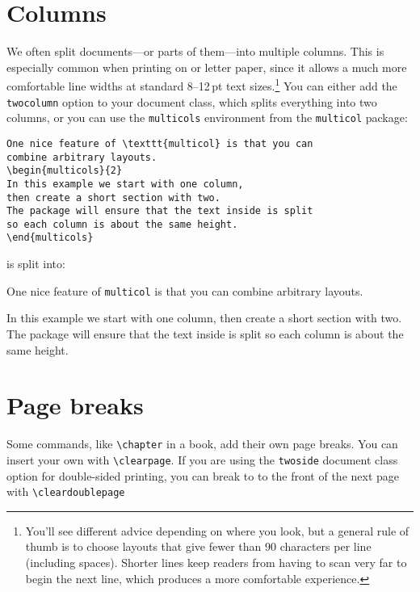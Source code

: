 \section{Columns}

We often split documents---or parts of them---into multiple columns.
This is especially common when printing on  or  letter
paper, since it allows a much more comfortable line widths at standard
8--12\,pt text sizes.\punckern\footnote{You'll see different advice depending
on where you look, but a general rule of thumb is to choose layouts that give
fewer than 90 characters per line (including spaces).
Shorter lines keep readers from having to scan very far to begin the next line,
which produces a more comfortable experience.}
You can either add the \texttt{twocolumn} option to your document class,
which splits everything into two columns, or you can use the \texttt{multicols}
environment from the \texttt{multicol} package:
\begin{leftfigure}
\begin{lstlisting}
One nice feature of \texttt{multicol} is that you can
combine arbitrary layouts.
\begin{multicols}{2}
In this example we start with one column,
then create a short section with two.
The package will ensure that the text inside is split
so each column is about the same height.
\end{multicols}
\end{lstlisting}
\end{leftfigure}
is split into:
\begin{leftfigure}
\lm%
One nice feature of \texttt{multicol} is that you can
combine arbitrary layouts.
\begin{multicols}{2}
In this example we start with one column,
then create a short section with two.
The package will ensure that the text inside is split
so each column is about the same height.
\end{multicols}
\end{leftfigure}

\section{Page breaks}

Some commands, like \verb|\chapter| in a book, add their own page breaks.
You can insert your own with \verb|\clearpage|.
If you are using the \texttt{twoside} document class option for double-sided
printing, you can break to to the front of the next page with
\verb|\cleardoublepage|


